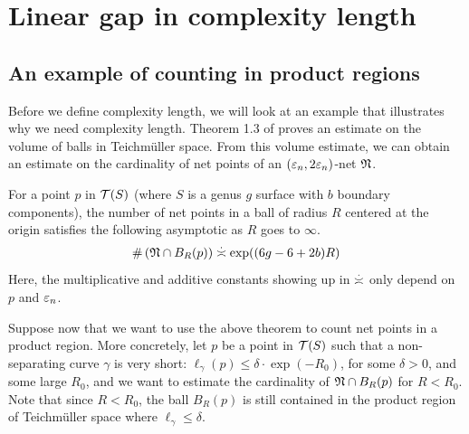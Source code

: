 \documentclass[12pt, reqno]{amsart}
\begin{document}


\section{Linear gap in complexity length}
\label{sec:line-gap-compl}

\subsection{An example of counting in product regions}
\label{sec:an-example-counting}

Before we define complexity length, we will look at an example that illustrates why we need complexity length.
Theorem 1.3 of \textcite{10.1215/00127094-1548443} proves an estimate on the volume of balls in Teichmüller space.
From this volume estimate, we can obtain an estimate on the cardinality of net points of an $(\varepsilon_n, 2 \varepsilon_n)$-net $\mathfrak{N}$.
\begin{theorem}
  \label{thm:abem}
  For a point $p$ in $\mathcal{T}(S)$ (where $S$ is a genus $g$ surface with $b$ boundary components), the number of net points in a ball of radius $R$ centered at the origin satisfies the following asymptotic as $R$ goes to $\infty$.
  \begin{align*}
    \#\left( \net \cap B_R(p) \right) \emul \exp((6g-6 + 2b)R)
  \end{align*}
  Here, the multiplicative and additive constants showing up in $\emul$ only depend on $p$ and $\varepsilon_n$.
\end{theorem}

Suppose now that we want to use the above theorem to count net points in a product region.
More concretely, let $p$ be a point in $\mathcal{T}(S)$ such that a non-separating curve $\gamma$ is very short: $\ell_{\gamma}(p) \leq \delta \cdot \exp(-R_0)$, for some $\delta > 0$, and some large $R_0$, and we want to estimate the cardinality of $\mathfrak{N} \cap B_R(p)$ for $R < R_0$.
Note that since $R < R_0$, the ball $B_R(p)$ is still contained in the product region of Teichmüller space where $\ell_\gamma \leq \delta$.
\end{document}
